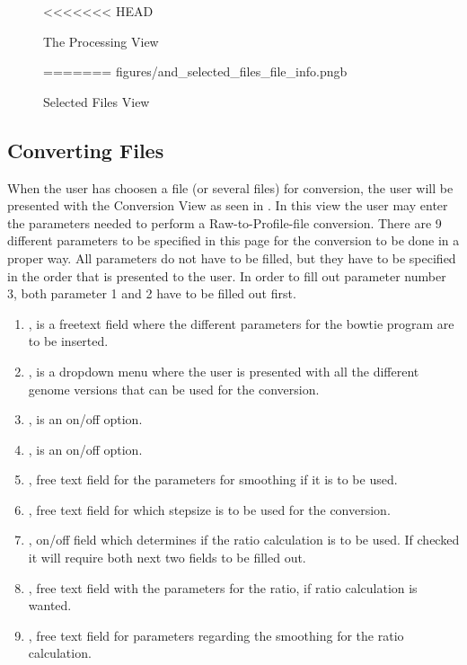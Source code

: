\begin{figure}[h]
<<<<<<< HEAD
\caption{The Processing View}
\label{fig:and_processing_man}
=======
		{figures/and_selected_files_file_info.png}{b}
\caption{Selected Files View}
\label{fig:and_selected_man}
\end{figure}
\FloatBarrier


\subsection{Converting Files}
When the user has choosen a file (or several files) for conversion, the user will be presented with the Conversion View as seen in . In this view the user may enter the parameters needed to perform a Raw-to-Profile-file conversion.
\newline
There are 9 different parameters to be specified in this page for the conversion to be done in a proper way. All parameters do not have to be filled, but they have to be specified in the order that is presented to the user. In order to fill out parameter number 3, both parameter 1 and 2 have to be filled out first.

\begin{enumerate}
	\item {}, is a freetext field where the different parameters for the bowtie program are to be inserted.
    \item {}, is a dropdown menu where the user is presented with all the different genome versions that can be used for the conversion.
    \item {}, is an on/off option.
    \item {}, is an on/off option. 
    \item {}, free text field for the parameters for smoothing if it is to be used.
    \item {}, free text field for which stepsize is to be used for the conversion.
    \item {}, on/off field which determines if the ratio calculation is to be used. If checked it will require both next two fields to be filled out.
    \item {}, free text field with the parameters for the ratio, if ratio calculation is wanted.
    \item {}, free text field for parameters regarding the smoothing for the ratio calculation.     

\end{enumerate}

